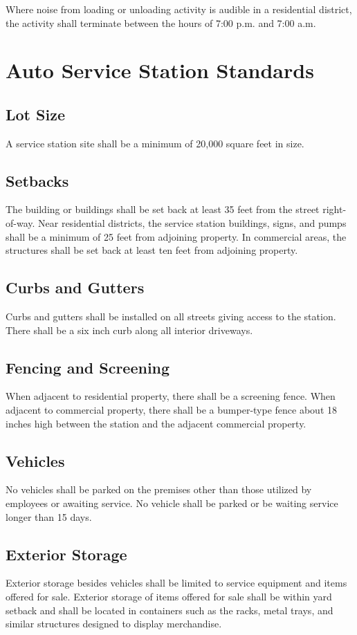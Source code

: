 \subsubsection{}
Where noise from loading or unloading activity is audible in a residential district, the activity shall terminate between the hours of 7:00 p.m. and 7:00 a.m.

\section{Auto Service Station Standards}
\subsection{Lot Size}
A service station site shall be a minimum of 20,000 square feet in size.
\subsection{Setbacks}
The building or buildings shall be set back at least 35 feet from the street right-of-way. Near residential districts, the service station buildings, signs, and pumps shall be a minimum of 25 feet from adjoining property. In commercial areas, the structures shall be set back at least ten feet from adjoining property.
\subsection{Curbs and Gutters}
Curbs and gutters shall be installed on all streets giving access to the station. There shall be a six inch curb along all interior driveways.
\subsection{Fencing and Screening}
When adjacent to residential property, there shall be a screening fence. When adjacent to commercial property, there shall be a bumper-type fence about 18 inches high between the station and the adjacent commercial property.
\subsection{Vehicles}
No vehicles shall be parked on the premises other than those utilized by employees or awaiting service. No vehicle shall be parked or be waiting service longer than 15 days.
\subsection{Exterior Storage}
Exterior storage besides vehicles shall be limited to service equipment and items offered for sale. Exterior storage of items offered for sale shall be within yard setback and shall be located in containers such as the racks, metal trays, and similar structures designed to display merchandise.
